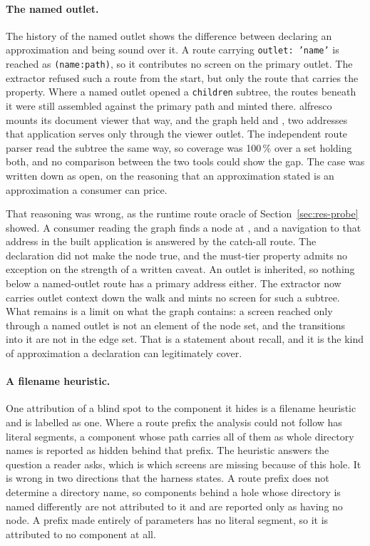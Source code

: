 \paragraph{The named outlet.}
\label{sec:named-outlet}
The history of the named outlet shows the difference between declaring an approximation and being sound over it. A route carrying \texttt{outlet: 'name'} is reached as \texttt{(name:path)}, so it contributes no screen on the primary outlet. The extractor refused such a route from the start, but only the route that carries the property. Where a named outlet opened a \texttt{children} subtree, the routes beneath it were still assembled against the primary path and minted there. alfresco mounts its document viewer that way, and the graph held  and , two addresses that application serves only through the viewer outlet. The independent route parser read the subtree the same way, so coverage was 100\,\% over a set holding both, and no comparison between the two tools could show the gap. The case was written down as open, on the reasoning that an approximation stated is an approximation a consumer can price.

That reasoning was wrong, as the runtime route oracle of Section~\ref{sec:res-probe} showed. A consumer reading the graph finds a node at , and a navigation to that address in the built application is answered by the catch-all route. The declaration did not make the node true, and the must-tier property admits no exception on the strength of a written caveat. An outlet is inherited, so nothing below a named-outlet route has a primary address either. The extractor now carries outlet context down the walk and mints no screen for such a subtree. What remains is a limit on what the graph contains: a screen reached only through a named outlet is not an element of the node set, and the transitions into it are not in the edge set. That is a statement about recall, and it is the kind of approximation a declaration can legitimately cover.

\paragraph{A filename heuristic.} One attribution of a blind spot to the component it hides is a filename heuristic and is labelled as one. Where a route prefix the analysis could not follow has literal segments, a component whose path carries all of them as whole directory names is reported as hidden behind that prefix. The heuristic answers the question a reader asks, which is which screens are missing because of this hole. It is wrong in two directions that the harness states. A route prefix does not determine a directory name, so components behind a hole whose directory is named differently are not attributed to it and are reported only as having no node. A prefix made entirely of parameters has no literal segment, so it is attributed to no component at all.

